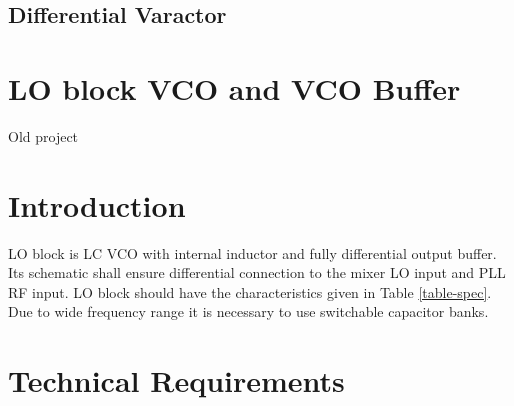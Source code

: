 \documentclass{article}
\begin{document}
\subsection{Differential Varactor}
%

\newpage

\section*{LO block VCO and VCO Buffer}

Old project

\section*{Introduction} %

LO block is LC VCO with internal inductor and fully differential output buffer. Its schematic shall ensure differential connection to the mixer LO input and PLL RF input. LO block should have the characteristics given in Table \ref{table-spec}. Due to wide frequency range it is necessary to use switchable capacitor banks.  

\section{Technical Requirements}
\end{document}
